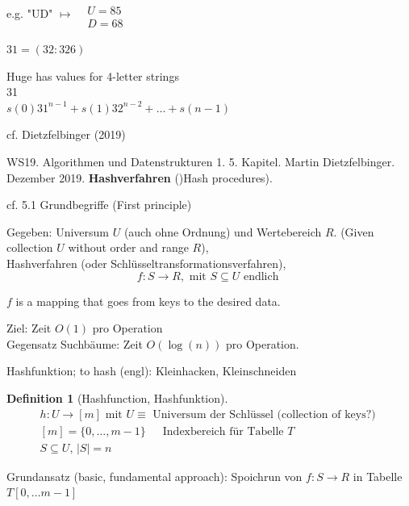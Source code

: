 \documentclass[10pt]{amsart}
\newtheorem{definition}{Definition}
\begin{document}
e.g. "UD" $\mapsto \begin{aligned} & \quad \\
	& U = 85 \\
	& D = 68 \end{aligned}$ 

$31 = (32 : 326)$ 

Huge has values for 4-letter strings \\
31 \\
$s(0) 31^{n-1} + s(1) 32^{n-2} + \dots + s(n-1)$

cf. Dietzfelbinger (2019) \cite{Diet2019}

WS19. Algorithmen und Datenstrukturen 1. 5. Kapitel. Martin Dietzfelbinger. Dezember 2019. \textbf{Hashverfahren} ()Hash procedures).

cf. 5.1 Grundbegriffe (First principle) \cite{Diet2019}

Gegeben: Universum $U$ (auch ohne Ordnung) und Wertebereich $R$. (Given collection $U$ without order and range $R$), \\
Hashverfahren (oder Schl\"{u}sseltransformationsverfahren),
\begin{equation}
f:S \to R, \text{ mit } S \subseteq U \text{ endlich }
\end{equation}

$f$ is a mapping that goes from keys to the desired data.

Ziel: Zeit $O(1)$ pro Operation \\

Gegensatz Suchb\"{a}ume: Zeit $O(\log{(n)})$ pro Operation.

Hashfunktion; to hash (engl): Kleinhacken, Kleinschneiden
\begin{definition}[Hashfunction, Hashfunktion]
	\begin{equation}
	\begin{gathered} 
	h: U \to [m ] \text{ mit } 
	U \equiv \text{ Universum der Schl\"{u}ssel  (collection of keys?) } \\
	[m] = \lbrace 0 , \dots , m-1 \rbrace \quad \, \text{ Indexbereich f\"{u}r Tabelle } T \\
	S \subseteq U, \, |S| = n
	\end{gathered} 
	\end{equation}
\end{definition}


Grundansatz (basic, fundamental approach): Spoichrun von $f: S \to R$ in Tabelle $T[0, \dots m-1]$ \\
\end{document}
